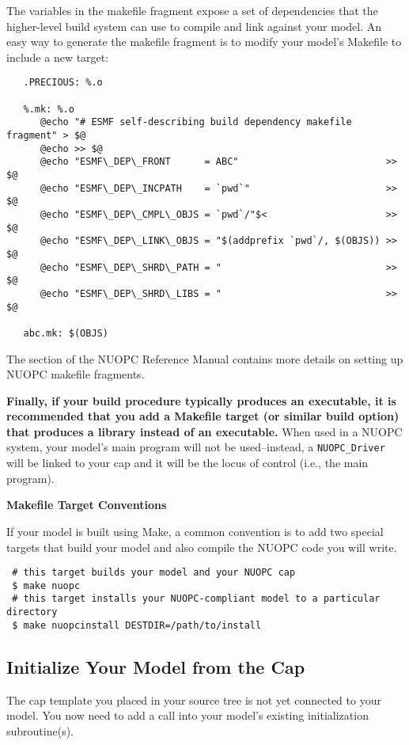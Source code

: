 The variables in the makefile fragment expose a set of dependencies that the
higher-level build system can use to compile and link against your model.
An easy way to generate the makefile fragment is to modify your model's
Makefile to include a new target:

\begin{verbatim}
   .PRECIOUS: %.o

   %.mk: %.o
      @echo "# ESMF self-describing build dependency makefile fragment" > $@
      @echo >> $@
      @echo "ESMF\_DEP\_FRONT      = ABC"                          >> $@
      @echo "ESMF\_DEP\_INCPATH    = `pwd`"                        >> $@
      @echo "ESMF\_DEP\_CMPL\_OBJS = `pwd`/"$<                     >> $@
      @echo "ESMF\_DEP\_LINK\_OBJS = "$(addprefix `pwd`/, $(OBJS)) >> $@
      @echo "ESMF\_DEP\_SHRD\_PATH = "                             >> $@
      @echo "ESMF\_DEP\_SHRD\_LIBS = "                             >> $@

   abc.mk: $(OBJS)
\end{verbatim}

The 
section of the NUOPC Reference Manual contains more details on setting up NUOPC makefile fragments.

\textbf{Finally, if your build procedure typically produces an executable, it is
recommended that you add a Makefile target (or similar build option)
that produces a library instead of an executable.}  When used in a NUOPC
system, your model's main program will not be used--instead, a {\tt NUOPC\_Driver}
will be linked to your cap and it will be the locus of control
(i.e., the main program).

\textbf{Makefile Target Conventions}

If your model is built using Make, a common convention is to add
two special targets that build your model and also compile the NUOPC
code you will write.

\begin{verbatim} 
 # this target builds your model and your NUOPC cap 
 $ make nuopc
 # this target installs your NUOPC-compliant model to a particular directory
 $ make nuopcinstall DESTDIR=/path/to/install
\end{verbatim}


\subsection{Initialize Your Model from the Cap}
\label{sec:initmodelfromcap}
The cap template you placed in your source tree is not yet connected
to your model.  You now need to add a call into your model's existing
initialization subroutine(s).

